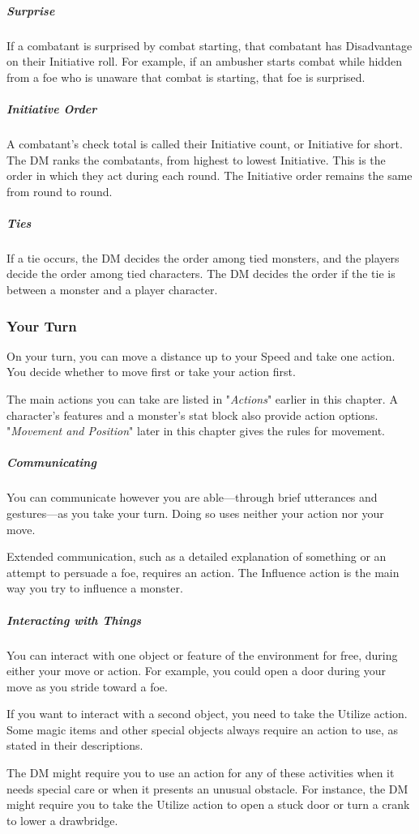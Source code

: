 \documentclass[10pt,a4paper,twoside,bg=print,twocolumn,openany,nodeprecatedcode]{dndbook}
\begin{document}
\subparagraph{Surprise}
If a combatant is surprised by combat starting, that combatant has Disadvantage on their Initiative roll. For example, if an ambusher starts combat while hidden from a foe who is unaware that combat is starting, that foe is surprised.

\subparagraph{Initiative Order}
A combatant's check total is called their Initiative count, or Initiative for short. The DM ranks the combatants, from highest to lowest Initiative. This is the order in which they act during each round. The Initiative order remains the same from round to round.

\subparagraph{Ties}
If a tie occurs, the DM decides the order among tied monsters, and the players decide the order among tied characters. The DM decides the order if the tie is between a monster and a player character.

\subsubsection{Your Turn}
On your turn, you can move a distance up to your Speed and take one action. You decide whether to move first or take your action first.

The main actions you can take are listed in "\textit{Actions}" earlier in this chapter. A character's features and a monster's stat block also provide action options. "\textit{Movement and Position}" later in this chapter gives the rules for movement.

\subparagraph{Communicating}
You can communicate however you are able—through brief utterances and gestures—as you take your turn. Doing so uses neither your action nor your move.

Extended communication, such as a detailed explanation of something or an attempt to persuade a foe, requires an action. The Influence action is the main way you try to influence a monster.

\subparagraph{Interacting with Things}
You can interact with one object or feature of the environment for free, during either your move or action. For example, you could open a door during your move as you stride toward a foe.

If you want to interact with a second object, you need to take the Utilize action. Some magic items and other special objects always require an action to use, as stated in their descriptions.

The DM might require you to use an action for any of these activities when it needs special care or when it presents an unusual obstacle. For instance, the DM might require you to take the Utilize action to open a stuck door or turn a crank to lower a drawbridge.
\end{document}
